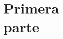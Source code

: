 \cleardoublepage
\begingroup
\makeatletter
\let\ps@plain\ps@empty
\part[Primera parte]{Primera\\parte}
\endgroup
